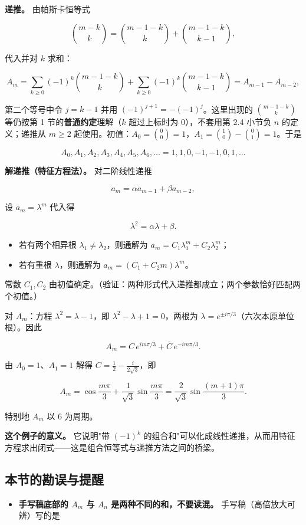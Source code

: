 \textbf{递推。} 由帕斯卡恒等式

\[
\binom{m-k}{k}=\binom{m-1-k}{k}+\binom{m-1-k}{k-1},
\]

代入并对 $k$ 求和：

\[
A_m=\sum_{k\ge0}(-1)^k\binom{m-1-k}{k}+\sum_{k\ge0}(-1)^k\binom{m-1-k}{k-1}
=A_{m-1}-A_{m-2},
\]

第二个等号中令 $j=k-1$ 并用 $(-1)^{j+1}=-(-1)^j$。这里出现的 $\binom{m-1-k}{k}$ 等仍按第 1 节的\textbf{普通约定}理解（$k$ 超过上标时为 $0$），不套用第 2.4 小节负 $n$ 的定义；递推从 $m\ge2$ 起使用。初值：$A_0=\binom00=1$，$A_1=\binom10-\binom01=1$。于是

\[
A_0,A_1,A_2,A_3,A_4,A_5,A_6,\dots=1,1,0,-1,-1,0,1,\dots
\]

\textbf{解递推（特征方程法）。} 对二阶线性递推

\[
a_m=\alpha a_{m-1}+\beta a_{m-2},
\]

设 $a_m=\lambda^m$ 代入得

\[
\lambda^2=\alpha\lambda+\beta .
\]

\begin{itemize}
\item 若有两个相异根 $\lambda_1\neq\lambda_2$，则通解为 $a_m=C_1\lambda_1^m+C_2\lambda_2^m$；
\item 若有重根 $\lambda$，则通解为 $a_m=(C_1+C_2m)\lambda^m$。
\end{itemize}


常数 $C_1,C_2$ 由初值确定。（验证：两种形式代入递推都成立；两个参数恰好匹配两个初值。）

对 $A_m$：方程 $\lambda^2=\lambda-1$，即 $\lambda^2-\lambda+1=0$，两根为 $\lambda=e^{\pm i\pi/3}$（六次本原单位根）。因此

\[
A_m=C\,e^{im\pi/3}+\overline{C}\,e^{-im\pi/3}.
\]

由 $A_0=1$、$A_1=1$ 解得 $C=\frac12-\frac{i}{2\sqrt3}$，即

\[
A_m=\cos\frac{m\pi}{3}+\frac1{\sqrt3}\sin\frac{m\pi}{3}
=\frac{2}{\sqrt3}\sin\frac{(m+1)\pi}{3}.
\]

特别地 $A_m$ 以 $6$ 为周期。

\textbf{这个例子的意义。} 它说明"带 $(-1)^k$ 的组合和"可以化成线性递推，从而用特征方程求出闭式——这是组合恒等式与递推方法之间的桥梁。

\subsection{本节的勘误与提醒}


\begin{itemize}
\item \textbf{手写稿底部的 $A_m$ 与 $A_n$ 是两种不同的和，不要读混。} 手写稿（高倍放大可辨）写的是
\end{itemize}


